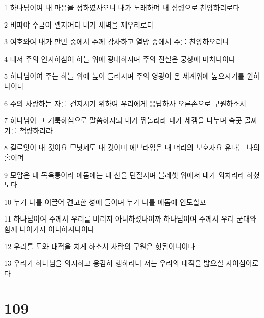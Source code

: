 \par 1 하나님이여 내 마음을 정하였사오니 내가 노래하며 내 심령으로 찬양하리로다
\par 2 비파야 수금아 깰지어다 내가 새벽을 깨우리로다
\par 3 여호와여 내가 만민 중에서 주께 감사하고 열방 중에서 주를 찬양하오리니
\par 4 대저 주의 인자하심이 하늘 위에 광대하시며 주의 진실은 궁창에 미치나이다
\par 5 하나님이여 주는 하늘 위에 높이 들리시며 주의 영광이 온 세계위에 높으시기를 원하나이다
\par 6 주의 사랑하는 자를 건지시기 위하여 우리에게 응답하사 오른손으로 구원하소서
\par 7 하나님이 그 거룩하심으로 말씀하시되 내가 뛰놀리라 내가 세겜을 나누며 숙곳 골짜기를 척량하리라
\par 8 길르앗이 내 것이요 므낫세도 내 것이며 에브라임은 내 머리의 보호자요 유다는 나의 홀이며
\par 9 모압은 내 목욕통이라 에돔에는 내 신을 던질지며 블레셋 위에서 내가 외치리라 하셨도다
\par 10 누가 나를 이끌어 견고한 성에 들이며 누가 나를 에돔에 인도할꼬
\par 11 하나님이여 주께서 우리를 버리지 아니하셨나이까 하나님이여 주께서 우리 군대와 함께 나아가지 아니하시나이다
\par 12 우리를 도와 대적을 치게 하소서 사람의 구원은 헛됨이니이다
\par 13 우리가 하나님을 의지하고 용감히 행하리니 저는 우리의 대적을 밟으실 자이심이로다

\chapter{109}

